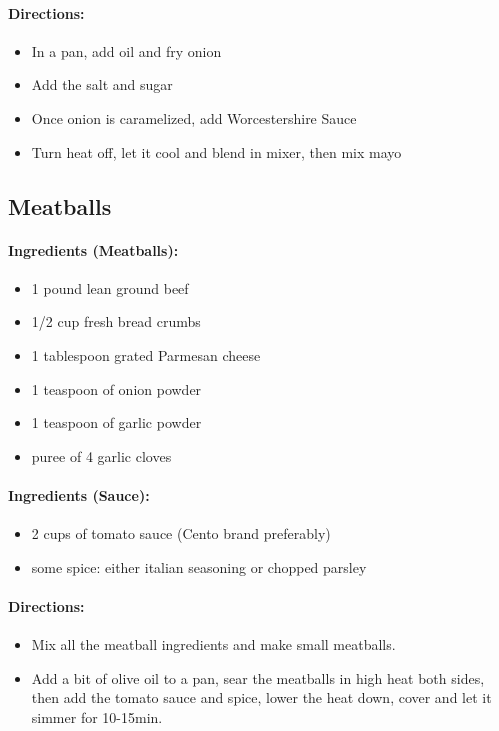 \documentclass{article}
\begin{document}
\paragraph{Directions:}
\begin{itemize}
	\item In a pan, add oil and fry onion
	\item Add the salt and sugar
	\item Once onion is caramelized, add Worcestershire Sauce
	\item Turn heat off, let it cool and blend in mixer, then mix mayo
\end{itemize} 

\subsection{Meatballs}

\paragraph{Ingredients (Meatballs):}

\begin{itemize}
	\item 1 pound lean ground beef 
	\item 1/2 cup fresh bread crumbs 
	\item 1 tablespoon grated Parmesan cheese 
	\item 1 teaspoon of onion powder
	\item 1 teaspoon of garlic powder
	\item puree of 4 garlic cloves 
\end{itemize}

\paragraph{Ingredients (Sauce):}
\begin{itemize}
	\item 2 cups of tomato sauce (Cento brand preferably)
	\item some spice: either italian seasoning or chopped parsley
\end{itemize}

\paragraph{Directions:}
\begin{itemize}
	\item Mix all the meatball ingredients and make small meatballs.
	\item Add a bit of olive oil to a pan, sear the meatballs in high heat both sides, then add the tomato sauce and spice, lower the heat down, cover and let it simmer for 10-15min.
\end{itemize}
\end{document}
